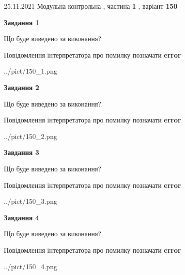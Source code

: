 \documentclass[10pt, ukrainian]{article}
\begin{document}
{25.11.2021 Модульна контрольна , частина \textbf { 1 }, варіант  \No \textbf { 150 }\par}
{
\begin {large}

{\begin {center}\textbf{Завдання 1}\end {center}}\par
Що буде виведено за виконання? \par
Повідомлення інтерпретатора про помилку позначати \textbf{error}

\begin{center}
	{../pict/150_1.png}
\end{center}
\newpage

{\begin {center}\textbf{Завдання 2}\end {center}}\par
Що буде виведено за виконання? \par
Повідомлення інтерпретатора про помилку позначати \textbf{error}

\begin{center}
	{../pict/150_2.png}
\end{center}
\newpage

{\begin {center}\textbf{Завдання 3}\end {center}}\par
Що буде виведено за виконання? \par
Повідомлення інтерпретатора про помилку позначати \textbf{error}

\begin{center}
	{../pict/150_3.png}
\end{center}
\newpage

{\begin {center}\textbf{Завдання 4}\end {center}}\par
Що буде виведено за виконання? \par
Повідомлення інтерпретатора про помилку позначати \textbf{error}

\begin{center}
	{../pict/150_4.png}
\end{center}
\newpage


\end{large}}
\end{document}
